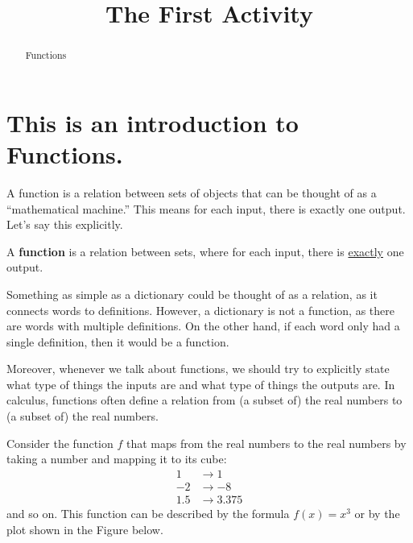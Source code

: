 \documentclass{ximera}
\title{The First Activity}
\theoremstyle{definition}
\begin{document}
  
\begin{abstract}  
Functions  
\end{abstract}  
\maketitle  
\section*{This is an introduction to Functions.}  
A function is a relation between sets of objects that can be thought of as a ``mathematical machine.'' This means for each input, there is exactly one output. Let’s say this explicitly.
\begin{definition}
	A \textbf{function} is a relation between sets, where for each input, there is \underline{exactly} one output.
\end{definition}
\begin{remark}
	Something as simple as a dictionary could be thought
	of as a relation, as it connects words to definitions.
	However, a dictionary is not a function, as there
	are words with multiple definitions. On the other
	hand, if each word only had a single definition, then
	it would be a function.
\end{remark}
Moreover, whenever we talk about functions, we should try to explicitly state what type of things the inputs are and what type of things the outputs are. In calculus, functions often define a relation from (a subset of) the real numbers to (a subset of) the real numbers.
\begin{example}
	Consider the function \(f\) that maps from the real numbers to
	the real numbers by taking a number and mapping it to its cube:
\begin{align*}
1&\to 1\\
-2&\to -8\\
1.5&\to 3.375
\end{align*}
and so on. This function can be described by the formula \(f(x)= x^3\) or by the plot shown in the Figure below.
\end{example}
\begin{image}
\end{image} 
\end{document}
